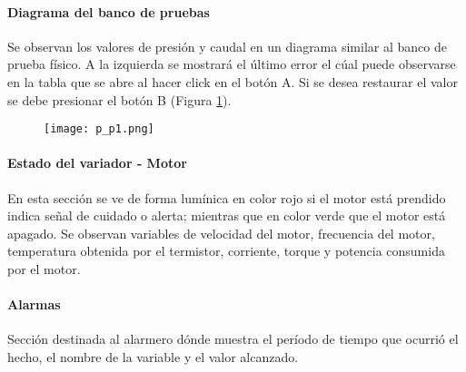 \paragraph{Diagrama del banco de pruebas}
Se observan los valores de presión y caudal en un diagrama similar al banco de prueba físico. A la izquierda se mostrará el último error el cúal puede observarse en la tabla que se abre al hacer click en el botón A. Si se desea restaurar el valor se debe presionar el botón B (Figura \ref{fig:pp1}).
\begin{figure}[h!]
	\centering
	\texttt{[image: p\_p1.png]}
	\label{fig:pp1}
\end{figure}

\paragraph{Estado del variador - Motor}
En esta sección se ve de forma lumínica en color rojo si el motor está prendido indica señal de cuidado o alerta; mientras que en color verde que el motor está apagado. Se observan variables de velocidad del motor, frecuencia del motor, temperatura obtenida por el termistor, corriente, torque y potencia consumida por el motor.
\paragraph{Alarmas}
Sección destinada al alarmero dónde muestra el período de tiempo que ocurrió el hecho, el nombre de la variable y el valor alcanzado.
